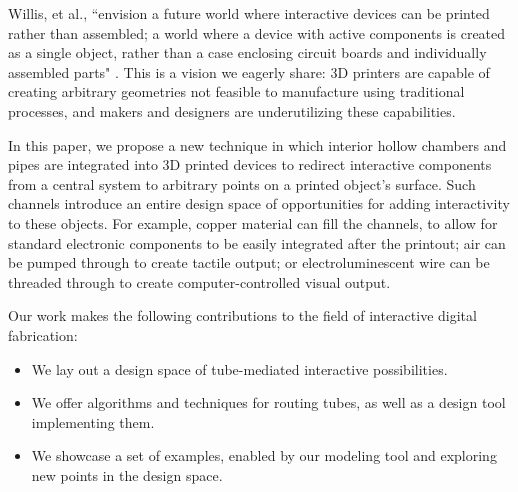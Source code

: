 Willis, et al., ``envision a future world where interactive devices can be printed rather than assembled; a world where a device with active components is created as a single object, rather than a case enclosing circuit boards and individually assembled parts" \cite{Willis-printedoptics}.  This is a vision we eagerly share: 3D printers are capable of creating arbitrary geometries not feasible to manufacture using traditional processes, and makers and designers are underutilizing these capabilities.

In this paper, we propose a new technique in which interior hollow chambers and pipes are integrated into 3D printed devices to redirect interactive components from a central system to arbitrary points on a printed object's surface. Such channels introduce an entire design space of opportunities for adding interactivity to these objects. For example, copper material can fill the channels, to allow for standard electronic components to be easily integrated after the printout; air can be pumped through to create tactile output; or electroluminescent wire can be threaded through to create computer-controlled visual output.

Our work makes the following contributions to the field of interactive digital fabrication:

\begin{itemize}
\item We lay out a design space of tube-mediated interactive possibilities. 
\item We offer algorithms and techniques for routing tubes, as well as a design tool implementing them.
\item We showcase a set of examples, enabled by our modeling tool and exploring new points in the design space.
\end{itemize}
